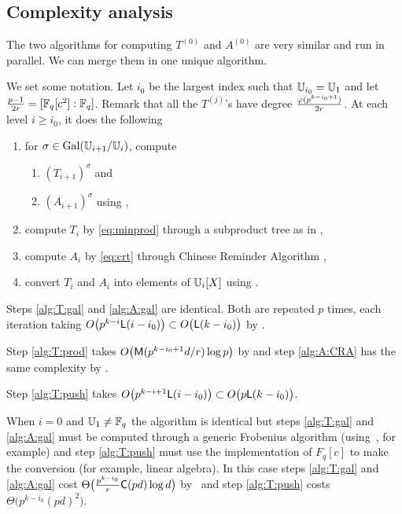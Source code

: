 \subsection{Complexity analysis}
\label{sec:C2-AS-FI:complexity}

The two algorithms for computing $T^{(0)}$ and $A^{(0)}$ are very
similar and run in parallel. We can merge them in one unique
algorithm.

We set some notation. Let $i_0$ be the largest index such that
$\mathbb{U}_{i_0} = \mathbb{U}_1$ and let $\frac{p-1}{2r} = [\mathbb{F}_q[c^2]:\mathbb{F}_q]$.  Remark
that all the $T^{(j)}$'s have degree $\frac{\varphi(p^{k-i_0+1})}{2r}$.
At each level $i\ge i_0$, it does the following

\begin{enumerate}
\item for $\sigma \in \operatorname{Gal}(\mathbb{U}_{i+1}/\mathbb{U}_i)$, compute
  \begin{enumerate}
  \item\label{alg:T:gal} $\left(T_{i+1}\right)^\sigma$ and
  \item\label{alg:A:gal} $\left(A_{i+1}\right)^\sigma$ using
    \cite[]{DFS09},
  \end{enumerate}
\item\label{alg:T:prod} compute $T_i$ by \eqref{eq:minprod}
  through a subproduct tree as in \cite[Algo. 10.3]{vzGG},
\item\label{alg:A:CRA} compute $A_i$ by \eqref{eq:crt} through
  Chinese Reminder Algorithm \cite[Algo. 10.16]{vzGG},
\item\label{alg:T:push} convert $T_i$ and $A_i$ into
  elements of $\mathbb{U}_i[X]$ using \cite[]{DFS09}.
\end{enumerate}

Steps \ref{alg:T:gal} and \ref{alg:A:gal} are identical. Both are
repeated $p$ times, each iteration taking $O\bigl(p^{k-i}{\sf
  L}(i-i_0)\bigr) \subset O\bigl({\sf L}(k-i_0)\bigr)$ by
\cite[Th. 17]{DFS09}.

Step \ref{alg:T:prod} takes $O\bigl(\mathsf{M}(p^{k-i_0+1}d/r)\log p\bigr)$
by \cite[Lemma 10.4]{vzGG} and step \ref{alg:A:CRA} has the same
complexity by \cite[Coro. 10.17]{vzGG}.

Step \ref{alg:T:push} takes $O\bigl(p^{k-i+1}{\sf L}(i-i_0)\bigr)
\subset O\bigl(p{\sf L}(k-i_0)\bigr)$.

When $i=0$ and $\mathbb{U}_1\ne\mathbb{F}_q$ the algorithm is identical but steps
\ref{alg:T:gal} and \ref{alg:A:gal} must be computed through a generic
Frobenius algorithm (using~\cite[Algorithm 5.2]{vzGS92}, for example)
and step \ref{alg:T:push} must use the implementation of $F_q[c]$ to
make the conversion (for example, linear algebra). In this case steps
\ref{alg:T:gal} and \ref{alg:A:gal} cost
$\Theta\bigl(\frac{p^{k-i_0}}{r}\mathsf{C}(pd)\log d \bigr)$
by~\cite[Lemma 5.3]{vzGS92} and step \ref{alg:T:push} costs
$\Theta\bigl(p^{k-i_0}(pd)^2\bigr)$.

